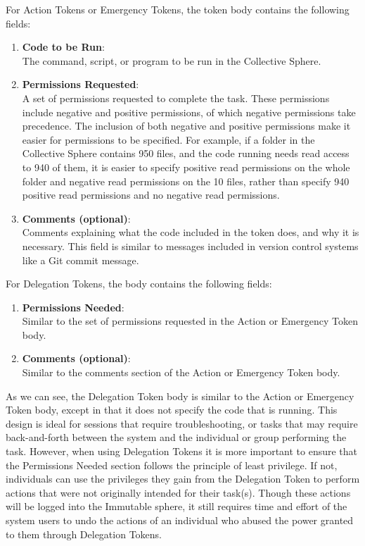 For Action Tokens or Emergency Tokens, the token body contains the following
fields:
\begin{enumerate}
\item \textbf{Code to be Run}:\\
The command, script, or program to be run in the Collective Sphere.
\item \textbf{Permissions Requested}:\\
A set of permissions requested to complete the task. These permissions include
negative and positive permissions, of which negative permissions take
precedence. The inclusion of both negative and positive permissions make it
easier for permissions to be specified. For example, if a folder in the
Collective Sphere contains 950 files, and the code running needs read access to
940 of them, it is easier to specify positive read permissions on the whole
folder and negative read permissions on the 10 files, rather than specify 940
positive read permissions and no negative read permissions.
\item \textbf{Comments (optional)}:\\
Comments explaining what the code included in the token does, and why it is
necessary. This field is similar to messages included in version control systems
like a Git commit message.
\end{enumerate}

For Delegation Tokens, the body contains the following fields:
\begin{enumerate}
\item \textbf{Permissions Needed}:\\
Similar to the set of permissions requested in the Action or Emergency Token
body.
\item \textbf{Comments (optional)}:\\
Similar to the comments section of the Action or Emergency Token body.
\end{enumerate}

As we can see, the Delegation Token body is similar to the Action or Emergency
Token body, except in that it does not specify the code that is running. This
design is ideal for sessions that require troubleshooting, or tasks that may
require back-and-forth between the system and the individual or group performing
the task. However, when using Delegation Tokens it is
more important to ensure that the Permissions Needed section follows the
principle of least privilege. If not, individuals can use the privileges they
gain from the Delegation Token to perform actions that were not originally
intended for their task(s). Though these actions will be logged into the
Immutable sphere, it still requires time and effort of the system users to undo
the actions of an individual who abused the power granted to them through
Delegation Tokens.

